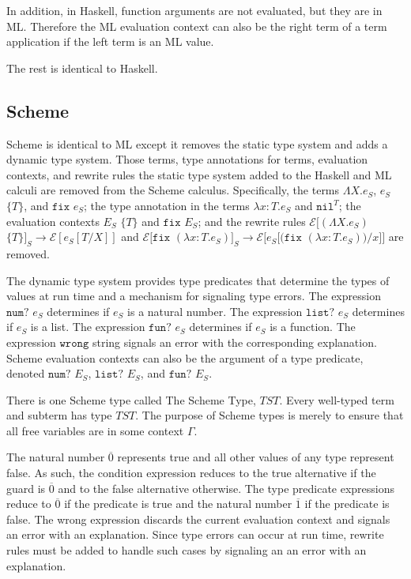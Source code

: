 In addition, in Haskell, function arguments are not evaluated, but they are in ML.  Therefore the ML evaluation context can also be the right term of a term application if the left term is an ML value.

The rest is identical to Haskell.

\subsection{Scheme}

Scheme is identical to ML except it removes the static type system and adds a dynamic type system.  Those terms, type annotations for terms, evaluation contexts, and rewrite rules the static type system added to the Haskell and ML calculi are removed from the Scheme calculus.  Specifically, the terms $\Lambda X.e_{S}$, $e_{S}$ $\lbrace T\rbrace$, and $\mathtt{fix}$ $e_{S}$; the type annotation in the terms $\lambda x:T.e_{S}$ and $\mathtt{nil}^{T}$; the evaluation contexts $E_{S}$ $\lbrace T\rbrace$ and $\mathtt{fix}$ $E_{S}$; and the rewrite rules $\mathscr{E}[(\Lambda X.e_{S})$ $\lbrace T\rbrace]_{S}\rightarrow\mathscr{E}[e_{S}[T/X]]$ and $\mathscr{E}[\mathtt{fix}$ $(\lambda x:T.e_{S})]_{S}\rightarrow\mathscr{E}[e_{S}[(\mathtt{fix}$ $(\lambda x:T.e_{S}))/x]]$ are removed.

The dynamic type system provides type predicates that determine the types of values at run time and a mechanism for signaling type errors.  The expression $\mathtt{num?}$ $e_{S}$ determines if $e_{S}$ is a natural number.  The expression $\mathtt{list?}$ $e_{S}$ determines if $e_{S}$ is a list.  The expression $\mathtt{fun?}$ $e_{S}$ determines if $e_{S}$ is a function.  The expression $\mathtt{wrong}$ string signals an error with the corresponding explanation.  Scheme evaluation contexts can also be the argument of a type predicate, denoted $\mathtt{num?}$ $E_{S}$, $\mathtt{list?}$ $E_{S}$, and $\mathtt{fun?}$ $E_{S}$.

There is one Scheme type called The Scheme Type, $TST$.  Every well-typed term and subterm has type $TST$.  The purpose of Scheme types is merely to ensure that all free variables are in some context $\Gamma$.

The natural number $\overline{0}$ represents true and all other values of any type represent false.  As such, the condition expression reduces to the true alternative if the guard is $\overline{0}$ and to the false alternative otherwise.  The type predicate expressions reduce to $\overline{0}$ if the predicate is true and the natural number $\overline{1}$ if the predicate is false.  The wrong expression discards the current evaluation context and signals an error with an explanation.  Since type errors can occur at run time, rewrite rules must be added to handle such cases by signaling an an error with an explanation.

